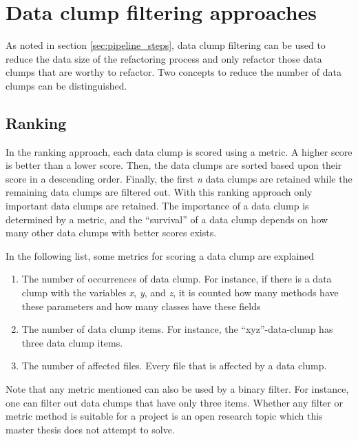 \section{Data clump filtering approaches}
\label{sec:data_clump_filtering}

As noted in section \ref{sec:pipeline_steps}, data clump filtering can be used to reduce the data size of the refactoring process and only refactor those data clumps that are worthy to refactor. Two concepts to  reduce the number of data clumps can be distinguished.
\subsection{Ranking}
In the ranking approach, each data clump is scored using a metric. A higher score is better than a lower score.  Then, the data clumps are sorted based upon their score in a descending order. Finally, the first  \textit{n} data clumps are retained while the remaining data clumps are filtered out. With this ranking approach only important data clumps are retained. The importance of a data clump is determined by a metric, and the \enquote{survival} of a data clump depends on how many other data clumps with better scores exists.

In the following list, some metrics for scoring a data clump are explained

\begin{enumerate}

    \item The number of occurrences of data clump. For instance, if there is a data clump with the variables \textit{x}, \textit{y}, and  \textit{z}, it is counted how many methods have these parameters and how many classes have these fields

     \item The number of data clump items. For instance, the \enquote{xyz}-data-clump has three data clump items.
     
    \item The number of affected files. Every file that is affected by a data clump. 
    
\end{enumerate}

Note that any metric mentioned can also be used by a binary filter. For instance, one can filter out data clumps that have only three items.
Whether any filter or metric method is suitable for a project is an open research topic which this master thesis does not attempt to solve. 

